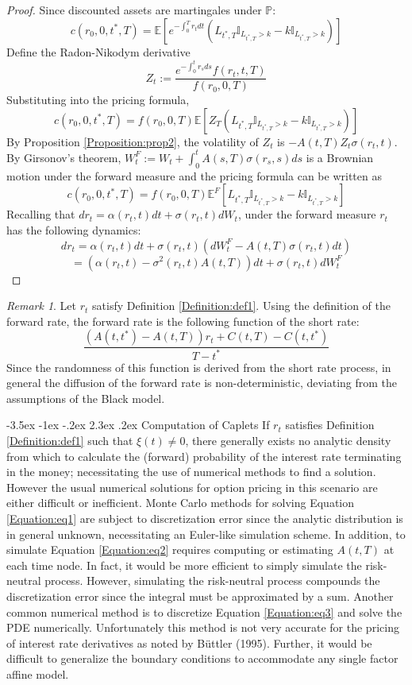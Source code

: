 \documentclass[12pt]{article}
\makeatletter
\renewcommand\section{\@startsection{section}{1}{\z@}%
                                  {-3.5ex \@plus -1ex \@minus -.2ex}%
                                  {2.3ex \@plus.2ex}%
                                  {\normalfont\large\bfseries}}
\theoremstyle{definition}
\theoremstyle{remark}
\newtheorem{rem}{Remark}
\makeatother
\begin{document}
\begin{proof}
Since discounted assets are martingales under \(\mathbb{P}\):
\[c(r_0, 0, {t^*}, T)=\mathbb{E}\left[e^{-\int_0 ^ T r_t dt}\left(L_{{t^*}, T} \mathbb{I}_{ L_{{t^*}, T}>k}  -k\mathbb{I}_{L_{{t^*}, T} >k}\right) \right] \]
Define the Radon-Nikodym derivative
\[Z_t:=\frac{e^{-\int_0 ^ t r_s ds} f(r_t, t, T)}{f(r_0, 0, T)}\]
Substituting into the pricing formula, 
\[c(r_0, 0, {t^*}, T)=f(r_0, 0,  T)\mathbb{E}\left[Z_{T} \left(L_{{t^*}, T} \mathbb{I}_{ L_{{t^*}, T}>k}  -k\mathbb{I}_{L_{{t^*}, T} >k}\right) \right] \]
By Proposition \ref{Proposition:prop2}, the volatility of \(Z_t\) is \(-A(t, T) Z_t\sigma(r_t, t)\).
By Girsonov's theorem, 
\(W_t^F := W_t +  \int_0 ^ t A(s, T) \sigma(r_s, s) ds \)
is a Brownian motion under the forward measure and the pricing formula can be written as 
\[c(r_0, 0, {t^*}, T)=f(r_0, 0, T)\mathbb{E}^F\left[L_{{t^*}, T} \mathbb{I}_{ L_{{t^*}, T}>k}  -k\mathbb{I}_{L_{{t^*}, T} >k}\right] \]
Recalling that \(dr_t=\alpha(r_t, t)dt+\sigma(r_t, t)dW_t \), under the forward measure \(r_t\) has the following dynamics:
\[dr_t=\alpha(r_t, t)dt+\sigma(r_t, t)(dW_t ^F - A(t, T)\sigma(r_t, t) dt) \]
\[=\left(\alpha(r_t, t)-\sigma^2 (r_t, t)A(t, T)\right)dt+
\sigma(r_t, t) dW_t^F \]
\end{proof}
\begin{rem}
Let \(r_t\) satisfy Definition \ref{Definition:def1}.  Using the definition of the forward rate, the forward rate is the following function of the short rate:
\[\frac{\left(A(t, {t^*})-A(t, T)\right) r_t+C(t, T)-C(t, {t^*}) }{T-{t^*}}\]
Since the randomness of this function is derived from the short rate process, in general the diffusion of the forward rate is non-deterministic, deviating from the assumptions of the Black model.  
\end{rem}
\section{Computation of Caplets}
If \(r_t\) satisfies Definition \ref{Definition:def1} such that \(\xi (t) \neq 0\), there generally exists no analytic density from which to calculate the (forward) probability of the interest rate terminating in the money; necessitating the use of numerical methods to find a solution.  However the usual numerical solutions for option pricing in this scenario are either difficult or inefficient.  Monte Carlo methods for solving Equation \ref{Equation:eq1} are subject to discretization error since the analytic distribution is in general unknown, necessitating an Euler-like simulation scheme. In addition, to simulate Equation \ref{Equation:eq2} requires computing or estimating \(A(t, T)\) at each time node.  In fact, it would be more efficient to simply simulate the risk-neutral process.  However, simulating the risk-neutral process compounds the discretization error since the integral must be approximated by a sum.  Another common numerical method is to discretize Equation \ref{Equation:eq3} and solve the PDE numerically.  Unfortunately this method is not very accurate for the pricing of interest rate derivatives as noted by B\"{u}ttler (1995).  Further, it would be difficult to generalize the boundary conditions to accommodate any single factor affine model.
\end{document}
